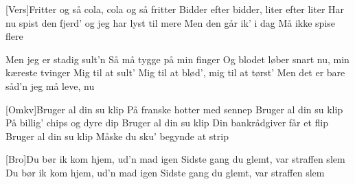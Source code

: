\documentclass[a4paper,11pt]{article}
\begin{document}
\begin{song}
[Vers]Fritter og så cola, cola og så fritter
Bidder efter bidder, liter efter liter
Har nu spist den fjerd' og jeg har lyst til mere
Men den går ik' i dag 
Må ikke spise flere

Men jeg er stadig sult'n
Så må tygge på min finger
Og blodet løber snart nu, min kæreste tvinger
Mig til at sult'
Mig til at blød', mig til at tørst'
Men det er bare såd'n jeg må leve, nu

[Omkv]Bruger al din su klip
På franske hotter med sennep 
Bruger al din su klip
På billig' chips og dyre dip
Bruger al din su klip
Din bankrådgiver får et flip
Bruger al din su klip
Måske du sku' begynde at strip 

[Bro]Du bør ik kom hjem, ud'n mad igen
Sidste gang du glemt, var straffen slem
Du bør ik kom hjem, ud'n mad igen
Sidste gang du glemt, var straffen slem
\end{song}
\end{document}
